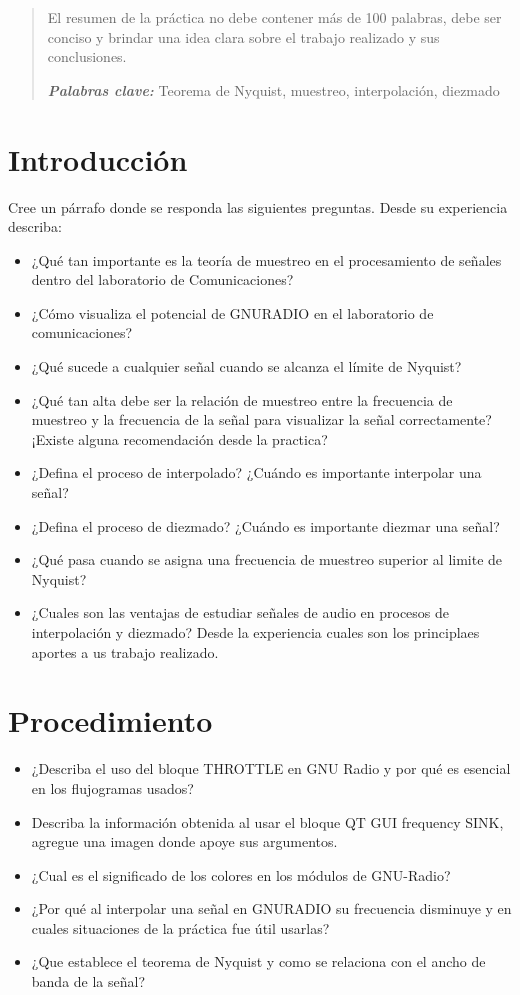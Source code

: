 \documentclass{journal}[IEEEtran, twocolumn]             %
\begin{document}
\begin{multicols}{2}

\begin{abstract}
    El resumen de la práctica no debe contener más de 100 palabras, debe ser conciso y brindar una idea clara sobre el trabajo realizado y sus conclusiones.

 \textit{\textbf{Palabras clave: }} Teorema de Nyquist, muestreo, interpolación, diezmado
\end{abstract}

\section{Introducción}

Cree un párrafo donde se responda las siguientes preguntas. Desde su experiencia describa:
\begin{itemize}
    \item ¿Qué tan importante es la teoría de muestreo en el procesamiento de señales dentro del laboratorio de Comunicaciones? 
    \item ¿Cómo visualiza el potencial de GNURADIO en el laboratorio de comunicaciones?
    \item ¿Qué sucede a cualquier señal cuando se alcanza el límite de Nyquist?
    \item ¿Qué tan alta debe ser la relación de muestreo entre la frecuencia de muestreo y la frecuencia de la señal para visualizar la señal correctamente? ¡Existe alguna recomendación desde la practica?
    \item ¿Defina el proceso de interpolado? ¿Cuándo es importante interpolar una señal?
    \item ¿Defina el proceso de diezmado? ¿Cuándo es importante diezmar una señal?
    \item ¿Qué pasa cuando se asigna una frecuencia de muestreo superior al limite de Nyquist?
    \item ¿Cuales son las ventajas de estudiar señales de audio en procesos de interpolación y diezmado? Desde la experiencia cuales son los principlaes aportes a us trabajo realizado. 
\end{itemize}

\section{Procedimiento}
\begin{itemize}
    \item ¿Describa el uso del bloque THROTTLE en GNU Radio y por qué es esencial en los flujogramas usados?
    \item Describa la información obtenida al usar el bloque QT GUI frequency SINK, agregue una imagen donde apoye sus argumentos.
    \item ¿Cual es el significado de los colores en los módulos de GNU-Radio?
    \item ¿Por qué al interpolar una señal en GNURADIO su frecuencia disminuye y en cuales  situaciones de la práctica fue útil usarlas?
    \item ¿Que establece el teorema de Nyquist y como se relaciona con el ancho de banda de la señal?
    

\end{itemize}
\end{multicols}
\end{document}
